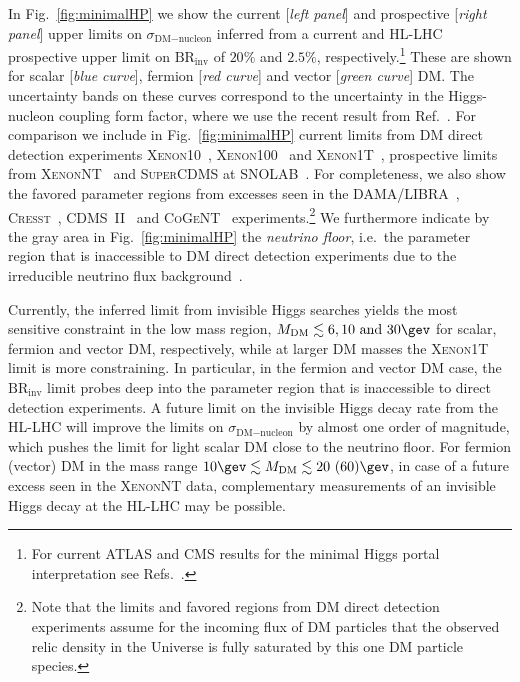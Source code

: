 \documentclass[../report.tex]{subfiles}
\newcommand{\BRHinv}{\mathrm{BR}_\mathrm{inv}}
\begin{document}
In Fig.~\ref{fig:minimalHP} we show the current [\emph{left panel}] and prospective [\emph{right panel}] upper limits on $\sigma_{\text{DM}-\text{nucleon}}$ inferred from a current and HL-LHC prospective upper limit on $\BRHinv$ of $20\%$ and $2.5\%$, respectively.\footnote{For current  ATLAS and CMS results for the minimal Higgs portal interpretation see Refs.~\cite{Aad:2015pla,Khachatryan:2016whc,Aaboud:2018sfi,Sirunyan:2018owy}.} These are shown for scalar [\emph{blue curve}], fermion [\emph{red curve}]  and vector [\emph{green curve}] DM. The uncertainty bands on these curves correspond to the uncertainty in the Higgs-nucleon coupling form factor, where we use the recent result from Ref.~\cite{Hoferichter:2017olk}. For comparison we include in Fig.~\ref{fig:minimalHP} current limits from DM direct detection experiments \textsc{Xenon10}~\cite{Angle:2011th}, \textsc{Xenon100}~\cite{Aprile:2012nq} and \textsc{Xenon1T}~\cite{Aprile:2018dbl}, prospective limits from \textsc{XenonNT}~\cite{Aprile:2015uzo} and \textsc{SuperCDMS} at SNOLAB~\cite{Agnese:2016cpb}. For completeness, we also show the favored parameter regions from excesses seen in the \textsc{DAMA/LIBRA}~\cite{Savage:2008er}, \textsc{Cresst}~\cite{Angloher:2011uu}, \textsc{CDMS~II}~\cite{Agnese:2013rvf} and \textsc{CoGeNT}~\cite{Aalseth:2012if} experiments.\footnote{Note that the limits and favored regions from DM direct detection experiments assume for the incoming flux of DM particles that the observed relic density in the Universe is fully saturated by this one DM particle species.} We furthermore indicate by the gray area in Fig.~\ref{fig:minimalHP} the \emph{neutrino floor}, i.e.~the parameter region that is inaccessible to DM direct detection experiments due to the irreducible neutrino flux background~\cite{Billard:2013qya}.

Currently, the inferred limit from invisible Higgs searches yields the most sensitive constraint in the low mass region, $M_\text{DM} \lesssim 6, 10~\mbox{and}~30\gev$ for scalar, fermion and vector DM, respectively, while at larger DM masses the \textsc{Xenon1T} limit is more constraining. In particular, in the fermion and vector DM case, the $\BRHinv$ limit probes deep into the parameter region that is inaccessible to direct detection experiments. A future limit on the invisible Higgs decay rate from the HL-LHC will improve the limits on $\sigma_{\text{DM}-\text{nucleon}}$ by almost one order of magnitude, which pushes the limit for light scalar DM close to the neutrino floor. For fermion (vector) DM in the mass range $10\gev \lesssim M_{\text{DM}} \lesssim 20~(60)\gev$, in case of a future excess seen in the \textsc{XenonNT} data, complementary measurements of an invisible Higgs decay at the HL-LHC may be possible. 
\end{document}
